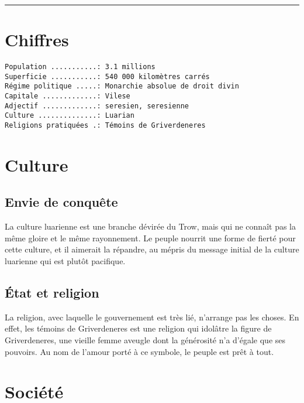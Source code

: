 \documentclass[french, a4paper, 12pt]{article}
\begin{document}
 \maketitle \vspace{3pt} \hrule \vspace{3pt}

\tableofcontents



\section{Chiffres}

\begin{verbatim}
Population ...........: 3.1 millions
Superficie ...........: 540 000 kilomètres carrés
Régime politique .....: Monarchie absolue de droit divin
Capitale .............: Vilese
Adjectif .............: seresien, seresienne
Culture ..............: Luarian
Religions pratiquées .: Témoins de Griverdeneres
\end{verbatim}

\section{Culture}


\subsection{Envie de conquête}

La culture luarienne est une branche dévirée du Trow, mais qui ne connaît pas la même gloire et le même rayonnement. Le peuple nourrit une forme de fierté pour cette culture, et il aimerait la répandre, au mépris du message initial de la culture luarienne qui est plutôt pacifique.

\subsection{État et religion}

La religion, avec laquelle le gouvernement est très lié, n'arrange pas les choses. En effet, les témoins de Griverdeneres est une religion qui idolâtre la figure de Griverdeneres, une vieille femme aveugle dont la générosité n'a d'égale que ses pouvoirs. Au nom de l'amour porté à ce symbole, le peuple est prêt à tout.

\section{Société}
\end{document}
